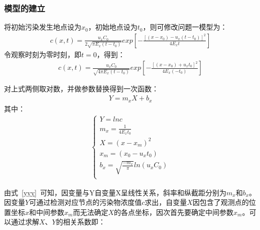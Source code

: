 \documentclass{whutmod}
\begin{document}
	\subsubsection{模型的建立}
	将初始污染发生地点设为$x_{0}$，初始地点设为$t_{0}$，则可修改问题一模型为：
	\begin{gather}
	c(x,t)=\frac{u_{x}C_{0}}{2\sqrt{\pi E_{x}(t-t_{0})}}exp[-\frac{[(x-x_{0})-u_{x}(t-t_{0})]^{2}}{4E_{x}t}]
	\end{gather}
	令观察时刻为零时刻，即$t=0$，得到：
	\begin{gather*}
		c(x,t)=\frac{u_{x}C_{0}}{\sqrt{4\pi E_{x}(t-t_{0})}}exp[-\frac{[(x-x_{0})+u_{x}t_{0}]^{2}}{4E_{x}(-t_{0})}]
	\end{gather*}
	
	对上式两侧取对数，并做参数替换得到一次函数：
	\begin{gather}
	Y=m_{x}X+b_{x}\label{yyy}
	\end{gather}
	其中：
	\begin{gather*}
		\left\{\begin{matrix}
			Y=lnc	\\
		m_{x}=\frac{1}{4E_{x}t_{0}} \\
		X=(x-x_{m})^{2} \\
		x_{m}=(x_{0}-u_{x}t_{0}) \\
		b_{x}=\sqrt{\frac{-m_{x}}{\pi}}ln(u_{x}C_{0})\\
		\end{matrix}\right.
	\end{gather*}
	
	由式~\ref{yyy}~可知，因变量与Y自变量X呈线性关系，斜率和纵截距分别为$m_{x}$和$b_{x}$。因变量$Y$可通过检测对应节点的污染物浓度值$c$求出，自变量$X$因包含了观测点的位置坐标$x$和中间参数$ x_{m}$而无法确定$X$的各点坐标，因次首先要确定中间参数$ x_{m}$。可以通过求解$X$、$Y$的相关系数\parencite{沈凤文2016点源污染的移动式检测定位及应用}即：
	
\end{document}
